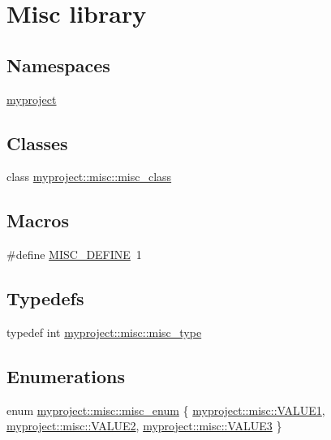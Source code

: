 \hypertarget{group__group__misc}{}\section{Misc library}
\label{group__group__misc}
\subsection*{Namespaces}
\begin{DoxyCompactItemize}
\item 
 \hyperlink{namespacemyproject}{myproject}
\end{DoxyCompactItemize}
\subsection*{Classes}
\begin{DoxyCompactItemize}
\item 
class \hyperlink{classmyproject_1_1misc_1_1misc__class}{myproject\+::misc\+::misc\+\_\+class}
\end{DoxyCompactItemize}
\subsection*{Macros}
\begin{DoxyCompactItemize}
\item 
\#define \hyperlink{group__group__misc_gaffc55897a14b87621002abc7a654369c}{M\+I\+S\+C\+\_\+\+D\+E\+F\+I\+NE}~1
\end{DoxyCompactItemize}
\subsection*{Typedefs}
\begin{DoxyCompactItemize}
\item 
typedef int \hyperlink{group__group__misc_gad226919cbe86fe93d4f5a89f25b1e4d8}{myproject\+::misc\+::misc\+\_\+type}
\end{DoxyCompactItemize}
\subsection*{Enumerations}
\begin{DoxyCompactItemize}
\item 
enum \hyperlink{group__group__misc_gac1a03dcef3fb6ac7f3d70216d14d86ca}{myproject\+::misc\+::misc\+\_\+enum} \{ \hyperlink{group__group__misc_ggac1a03dcef3fb6ac7f3d70216d14d86caad7805af80c7cf110f2733483a07253f3}{myproject\+::misc\+::\+V\+A\+L\+U\+E1}, 
\hyperlink{group__group__misc_ggac1a03dcef3fb6ac7f3d70216d14d86caac856322c422ad039e47f8551b4bcfb77}{myproject\+::misc\+::\+V\+A\+L\+U\+E2}, 
\hyperlink{group__group__misc_ggac1a03dcef3fb6ac7f3d70216d14d86caa8470a6b37c04b4c34d0bc41314c4556f}{myproject\+::misc\+::\+V\+A\+L\+U\+E3}
 \}
\end{DoxyCompactItemize}
